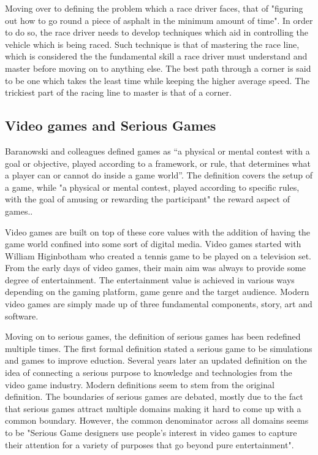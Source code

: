 \documentclass{article}
\begin{document}
Moving over to defining the problem which a race driver faces, that of "figuring out how to go round a piece of asphalt in the minimum amount of time"\cite{GoingFaster}. In order to do so, the race driver needs to develop techniques which aid in controlling the vehicle which is being raced. Such technique is that of mastering the race line, which is considered the the fundamental skill a race driver must understand and master before moving on to anything else\cite{GoingFaster}. The best path through a corner is said to be one which takes the least time while keeping the higher average speed\cite{beckman1991physics}. The trickiest part of the racing line to master is that of a corner.

\subsection{Video games and Serious Games}

Baranowski and colleagues defined games as “a physical or mental contest with a goal or objective, played according to a framework, or rule, that determines what a player can or cannot do inside a game world”. The definition covers the setup of a game, while "a physical or mental contest, played according to specific rules, with the goal of amusing or rewarding the participant" the reward aspect of games.\cite{yuserious}.

Video games are built on top of these core values with the addition of having the game world confined into some sort of digital media. Video games started with William Higinbotham who created a tennis game to be played on a television set\cite{stanton2015brief}. From the early days of video games, their main aim was always to provide some degree of entertainment. The entertainment value is achieved in various ways depending on the gaming platform, game genre and the target audience. Modern video games are simply made up of three fundamental components, story, art and software\cite{zyda2005visual}.

Moving on to serious games, the definition of serious games has been redefined multiple times. The first formal definition stated a serious game to be simulations and games to improve eduction\cite{abt1970}. Several years later an updated definition on the idea of connecting a serious purpose to knowledge and technologies from the video game industry\cite{michael2005serious}. Modern definitions seem to stem from the original definition\cite{michael2005serious}\cite{zyda2005visual}. The boundaries of serious games are debated, mostly due to the fact that serious games attract multiple domains making it hard to come up with a common boundary. However, the common denominator across all domains seems to be "Serious Game designers use people's interest in video games to capture their attention for a variety of purposes that go beyond pure entertainment"\cite{djaouti2011classifying}.
\end{document}
